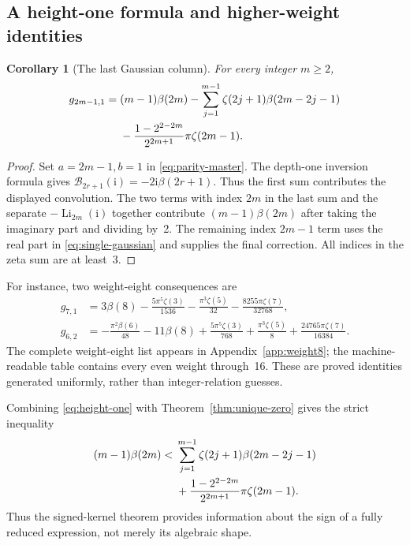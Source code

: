 \documentclass[11pt,a4paper]{article}
\numberwithin{equation}{section}
\newtheorem{corollary}[theorem]{Corollary}
\theoremstyle{definition}
\theoremstyle{remark}
\newcommand{\Li}{\operatorname{Li}}
\newcommand{\ii}{\mathrm{i}}
\newcommand{\BB}{\mathcal B}
\begin{document}
\subsection{A height-one formula and higher-weight identities}
\begin{corollary}[The last Gaussian column]\label{cor:height-one}
For every integer $m\ge2$,
\begin{align}\label{eq:height-one}
 g_{2m-1,1}={}&(m-1)\beta(2m)
 -\sum_{j=1}^{m-1}\zeta(2j+1)\beta(2m-2j-1)\notag\\
 &-\frac{1-2^{2-2m}}{2^{2m+1}}\pi\zeta(2m-1).
\end{align}
\end{corollary}
\begin{proof}
Set $a=2m-1,b=1$ in \eqref{eq:parity-master}. The depth-one inversion formula gives
$\BB_{2r+1}(\ii)=-2\ii\beta(2r+1)$. Thus the first sum contributes the displayed convolution. The two terms with index $2m$ in the last sum and the separate $-\Li_{2m}(\ii)$ together contribute $(m-1)\beta(2m)$ after taking the imaginary part and dividing by~2. The remaining index $2m-1$ term uses the real part in \eqref{eq:single-gaussian} and supplies the final correction. All indices in the zeta sum are at least~3.
\end{proof}
For instance, two weight-eight consequences are
\begin{align}
 g_{7,1}&=3\beta(8)-\frac{5\pi^5\zeta(3)}{1536}
                  -\frac{\pi^3\zeta(5)}{32}
                  -\frac{8255\pi\zeta(7)}{32768},\label{eq:g71}\\
 g_{6,2}&=-\frac{\pi^2\beta(6)}{48}-11\beta(8)
          +\frac{5\pi^5\zeta(3)}{768}+\frac{\pi^3\zeta(5)}8
          +\frac{24765\pi\zeta(7)}{16384}.\label{eq:g62}
\end{align}
The complete weight-eight list appears in Appendix~\ref{app:weight8}; the machine-readable table contains every even weight through~16. These are proved identities generated uniformly, rather than integer-relation guesses.

Combining \eqref{eq:height-one} with Theorem~\ref{thm:unique-zero} gives the strict inequality
\begin{align}\label{eq:beta-inequality}
 (m-1)\beta(2m)<{}&\sum_{j=1}^{m-1}\zeta(2j+1)\beta(2m-2j-1)\notag\\
 &+\frac{1-2^{2-2m}}{2^{2m+1}}\pi\zeta(2m-1).
\end{align}
Thus the signed-kernel theorem provides information about the sign of a fully reduced expression, not merely its algebraic shape.
\end{document}
